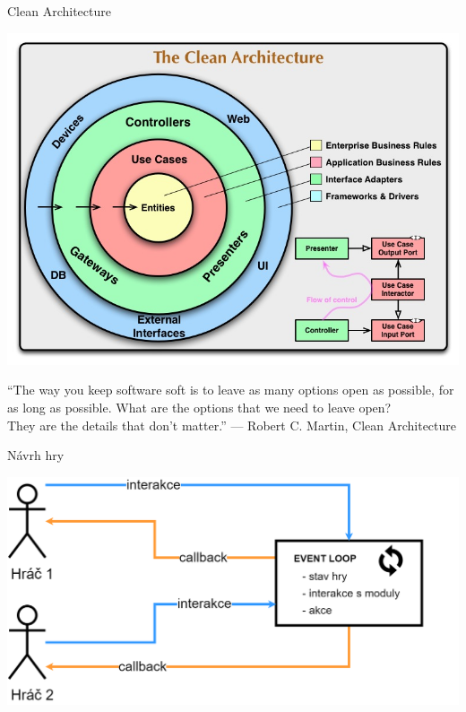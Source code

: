 \documentclass[czech,aspectratio=169]{beamer}
\begin{document}
  \begin{frame}{Clean Architecture}
    \begin{center}
      \includegraphics[width=.6\textwidth]{slides/logo-clean-architecture}
    \end{center}
  \end{frame}

  \begin{frame}
      \begin{center}
        {\large ``The way you keep software soft is
      to leave as many options open as possible,
      for as long as possible.
      What are the options that we need to leave open?\\
      They are the details
      that don’t matter.''}
      \vskip5mm
      --- Robert C. Martin, Clean Architecture
      \end{center}
  \end{frame}

  \begin{frame}{Návrh hry}
    \begin{center}
      \includegraphics[width=.9\textwidth]{slides/event-loop}
    \end{center}
  \end{frame}
\end{document}
